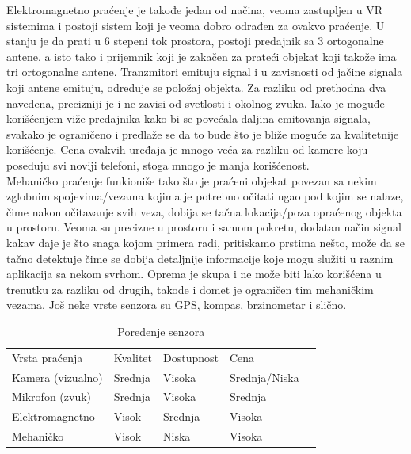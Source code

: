 \documentclass[a4paper]{article}
\begin{document}
	Elektromagnetno praćenje je takođe jedan od načina, veoma zastupljen u VR sistemima i postoji sistem koji je veoma dobro odrađen za ovakvo praćenje. U stanju je da prati u 6 stepeni tok prostora, postoji predajnik sa 3 ortogonalne antene, a isto tako i prijemnik koji je zakačen za prateći objekat koji takože ima tri ortogonalne antene. Tranzmitori emituju signal i u zavisnosti od jačine signala koji antene emituju, određuje se položaj objekta. Za razliku od prethodna dva navedena, precizniji je i ne zavisi od svetlosti i okolnog zvuka. Iako je moguđe korišćenjem viže predajnika kako bi se povećala daljina emitovanja signala, svakako je ograničeno i predlaže se da to bude što je bliže moguće za kvalitetnije korišćenje. Cena ovakvih uređaja je mnogo veća za razliku od kamere koju poseduju svi noviji telefoni, stoga mnogo je manja korišćenost.\\
	Mehaničko praćenje funkioniše tako što je praćeni objekat povezan sa nekim zglobnim spojevima/vezama kojima je potrebno očitati ugao pod kojim se nalaze, čime nakon očitavanje svih veza, dobija se tačna lokacija/poza opraćenog objekta u prostoru. Veoma su precizne u prostoru i samom pokretu, dodatan način signal kakav daje je što snaga kojom primera radi, pritiskamo prstima nešto, može da se tačno detektuje čime se dobija detaljnije informacije koje mogu služiti u raznim aplikacija sa nekom svrhom. Oprema je skupa i ne može biti lako korišćena u trenutku za razliku od drugih, takođe i domet je ograničen tim mehaničkim vezama. Još neke vrste senzora su GPS, kompas, brzinometar i slično.\\

        \begin{table}[hbt!]
    \centering
    \caption{Poređenje senzora}
    \label{tab:my-table}
    \begin{tabular}{|l|l|l|l|l}
    \cline{1-4}
    Vrsta praćenja    & Kvalitet & Dostupnost & Cena          &  \\ \cline{1-4}
    Kamera (vizualno) & Srednja  & Visoka     & Srednja/Niska &  \\
    Mikrofon (zvuk)   & Srednja  & Visoka     & Srednja       &  \\
    Elektromagnetno   & Visok    & Srednja    & Visoka        &  \\
    Mehaničko         & Visok    & Niska      & Visoka        &  \\ \cline{1-4}
    \end{tabular}
    \end{table}
\end{document}

